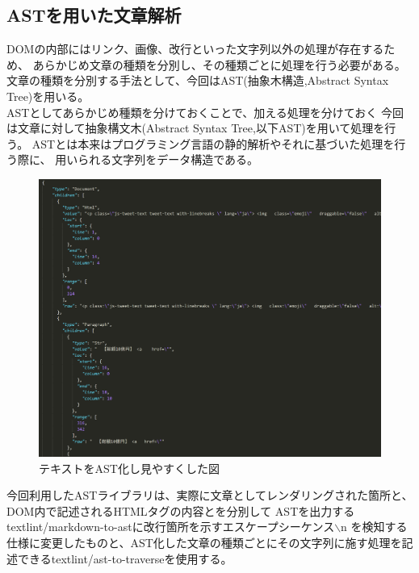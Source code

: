 \subsection{ASTを用いた文章解析}
DOMの内部にはリンク、画像、改行といった文字列以外の処理が存在するため、
あらかじめ文章の種類を分別し、その種類ごとに処理を行う必要がある。
文章の種類を分別する手法として、今回はAST(抽象木構造,Abstract Syntax Tree)を用いる。
\\ASTとしてあらかじめ種類を分けておくことで、加える処理を分けておく
今回は文章に対して抽象構文木(Abstract Syntax Tree,以下AST)を用いて処理を行う。
ASTとは本来はプログラミング言語の静的解析やそれに基づいた処理を行う際に、
用いられる文字列をデータ構造である。
\begin{figure}[H]
    \centering
    \label{fig:image15}
    \includegraphics[width=0.8\columnwidth]{image/03/img5.png}
	\caption[テキストをAST化し見やすくした図]{テキストをAST化し見やすくした図}
\end{figure}

今回利用したASTライブラリは、実際に文章としてレンダリングされた箇所と、DOM内で記述されるHTMLタグの内容とを分別して
ASTを出力するtextlint/markdown-to-astに改行箇所を示すエスケープシーケンス$\backslash$n
を検知する仕様に変更したものと\footnotemark[2]、AST化した文章の種類ごとにその文字列に施す処理を記述できるtextlint/ast-to-traverseを使用する。\footnotemark[3]

